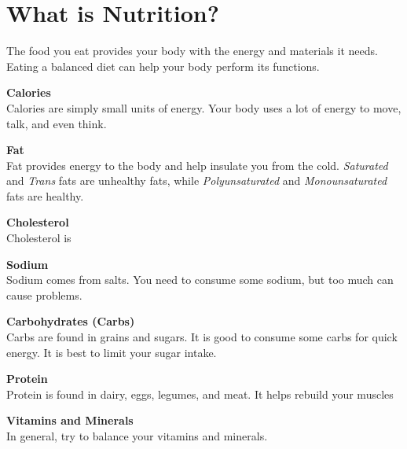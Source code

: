 \chapter{What is Nutrition?}

The food you eat provides your body with the energy and materials it needs. Eating a balanced diet can help your body perform its functions.

\textbf{Calories} \\
Calories are simply small units of energy. Your body uses a lot of energy to move, talk, and even think.

\textbf{Fat} \\
Fat provides energy to the body and help insulate you from the cold. \textit{Saturated} and \textit{Trans} fats are unhealthy fats, while \textit{Polyunsaturated} and \textit{Monounsaturated} fats are healthy.

\textbf{Cholesterol} \\
Cholesterol is

\textbf{Sodium} \\
Sodium comes from salts. You need to consume some sodium, but too much can cause problems.

\textbf{Carbohydrates (Carbs)} \\
Carbs are found in grains and sugars. It is good to consume some carbs for quick energy. It is best to limit your sugar intake.

\textbf{Protein} \\
Protein is found in dairy, eggs, legumes, and meat. It helps rebuild your muscles

\textbf{Vitamins and Minerals} \\
In general, try to balance your vitamins and minerals.